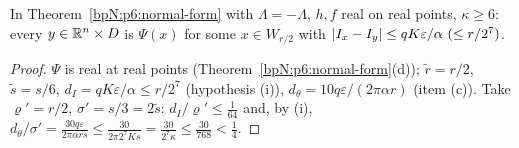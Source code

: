 \begin{corollary}\label{bpN:p7:preimage-nfl}
In Theorem~\ref{bpN:p6:normal-form} with $\Lambda=-\Lambda$, $h,f$ real on real points, $\kappa\ge6$: every $y\in\mathbb{R}^n\times D$ is $\Psi(x)$ for some $x\in W_{r/2}$ with $\abs{I_x-I_y}\le qK\varepsilon/\alpha\ (\le r/2^7)$.
\end{corollary}
\begin{proof}
\label{stepN:p7:pn-apply} $\Psi$ is real at real points (Theorem~\ref{bpN:p6:normal-form}(d)); $\tilde r=r/2$, $\tilde s=s/6$, $d_I=qK\varepsilon/\alpha\le r/2^7$ (hypothesis (i)), $d_\theta=10q\varepsilon/(2\pi\alpha r)$ (item (c)). Take $\varrho'=r/2$, $\sigma'=s/3=2\tilde s$: $d_I/\varrho'\le\frac1{64}$ and, by (i), $d_\theta/\sigma'=\frac{30q\varepsilon}{2\pi\alpha rs}\le\frac{30}{2\pi2^7Ks}=\frac{30}{2^7\kappa}\le\frac{30}{768}<\frac14$.
\end{proof}

